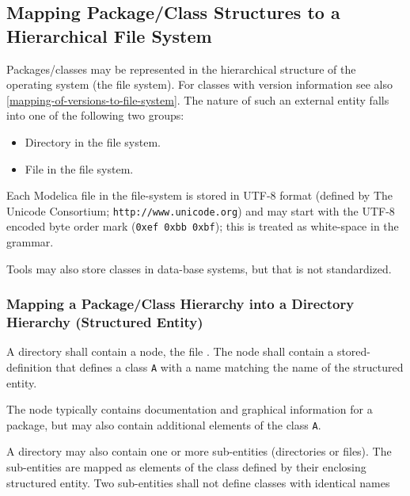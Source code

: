 \subsection{Mapping Package/Class Structures to a Hierarchical File System}

Packages/classes may be represented in the hierarchical structure of the
operating system (the file system). For classes with version
information see also \autoref{mapping-of-versions-to-file-system}. The nature of such an external
entity falls into one of the following two groups:
\begin{itemize}
\item
  Directory in the file system.
\end{itemize}

\begin{itemize}
\item
  File in the file system.
\end{itemize}

Each Modelica file in the file-system is stored in UTF-8 format (defined
by The Unicode Consortium; \lstinline!http://www.unicode.org!) and may start with
the UTF-8 encoded byte order mark (\lstinline!0xef 0xbb 0xbf!); this is treated as
white-space in the grammar.

\begin{nonnormative}
Tools may also store classes in data-base systems, but that is not standardized.
\end{nonnormative}

\subsubsection{Mapping a Package/Class Hierarchy into a Directory Hierarchy (Structured Entity)}

A directory shall contain a node, the file . The node shall contain a stored-definition that defines a class \lstinline!A! with a name
matching the name of the structured entity.

\begin{nonnormative}
The node typically contains documentation and graphical information for a package, but may also contain additional elements of the class \lstinline!A!.
\end{nonnormative}

A directory may also contain one or more sub-entities (directories or
files). The sub-entities are mapped as elements of the class defined by
their enclosing structured entity.  Two sub-entities shall not define classes with identical names

